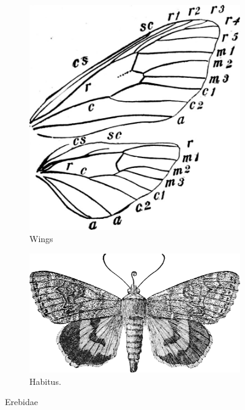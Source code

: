 \documentclass[letterpaper, 11pt]{article}
\begin{document}
\begin{figure}[ht!]
    \centering
    \begin{subfigure}[ht!]{0.36\textwidth}
        \includegraphics[width=\textwidth]{ErebidWings}
        \caption{Wings \citep[][Fig. 450]{bhl83152}}
        \label{fig:erebid1}
    \end{subfigure}
    \qquad
    \begin{subfigure}[ht!]{0.5\textwidth}
        \includegraphics[width=\textwidth]{catocala.png}
        \caption{Habitus. \citep[Modified from Fig. 53 in][]{bhlitem118262}}
        \label{fig:erebid2}
    \end{subfigure}
    \caption{Erebidae}\label{fig:erebids}
\end{figure}
\end{document}
